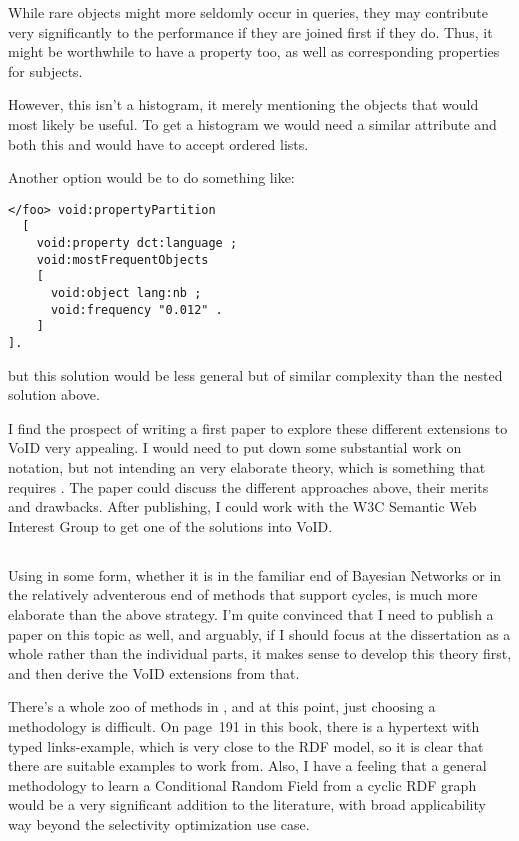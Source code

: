 While rare objects might more seldomly occur in queries, they may
contribute very significantly to the performance if they are joined
first if they do. Thus, it might be worthwhile to have a property
 too, as well as corresponding
properties for subjects.


However, this isn't a histogram, it merely mentioning the objects that
would most likely be useful. To get a histogram we would need a
similar  attribute and both this and
 would have to accept ordered
lists. 

Another option would be to do something like:
\begin{verbatim}
</foo> void:propertyPartition 
  [
    void:property dct:language ;
    void:mostFrequentObjects 
    [
      void:object lang:nb ;
      void:frequency "0.012" .
    ]
].
\end{verbatim}
but this solution would be less general but of similar complexity than
the nested solution above.

I find the prospect of writing a first paper to explore these different
extensions to VoID very appealing. I would need to put down some
substantial work on notation, but not intending an very elaborate
theory, which is something that requires \SRL. The paper could discuss
the different approaches above, their merits and drawbacks. After
publishing, I could work with the W3C Semantic Web Interest Group to
get one of the solutions into VoID.


\subsection{\SRL}

Using \SRL{} in some form, whether it is in the familiar end of
Bayesian Networks or in the relatively adventerous end of methods that
support cycles, is much more elaborate than the above strategy. I'm
quite convinced that I need to publish a paper on this topic as well,
and arguably, if I should focus at the dissertation as a whole rather
than the individual parts, it makes sense to develop this theory
first, and then derive the VoID extensions from that.

There's a whole zoo of methods in \cite{srlbook}, and at this point,
just choosing a methodology is difficult. On page~191 in this book,
there is a hypertext with typed links-example, which is very close to
the RDF model, so it is clear that there are suitable examples to work
from. Also, I have a feeling that a general methodology to learn a
Conditional Random Field from a cyclic RDF graph would be a very
significant addition to the literature, with broad applicability way
beyond the selectivity optimization use case.

